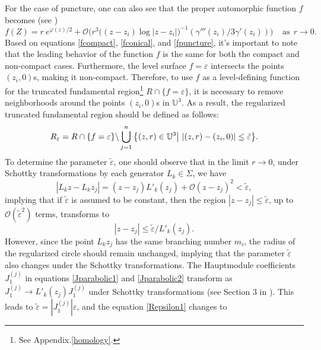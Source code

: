 \documentclass[a4paper,11pt]{article}
\begin{document}
For the case of puncture, one can also see that the proper automorphic function $f$ becomes 
(see \cite{park2017potentials})
\begin{equation}
f(Z)=r~e^{\varphi(z)/2} +\mathcal{O}\bigg(r^3 \big((z-z_i)\log|z-z_i
|\big)^{-1}(\gamma'''(z_i)/3\gamma'(z_i))\bigg)~~~~~ \text{as} ~~r\rightarrow 0.\label{fpuncture}
\end{equation}
Based on equations \eqref{fcompact}, \eqref{fconical}, and \eqref{fpuncture}, it's important to note that the leading behavior of the function $f$ is the same for both the compact and non-compact cases. Furthermore, the level surface $f=\varepsilon$ intersects the points $(z_i,0)$s, making it non-compact. Therefore, to use  $f$ as a level-defining function for the truncated fundamental region\footnote{See Appendix.\ref{homology}.} $R\cap\{f=\varepsilon\}$, it is necessary to remove neighborhoods around the points $(z_i,0)$s in $\mathbb{U}^3$. As a result, the regularized truncated fundamental region should be defined as follows:
\begin{equation}
R_{\varepsilon} = R\cap\{f=\varepsilon\}\backslash \bigcup_{j=1}^{n}\big{\{}(z,r)\in\mathbb{U}^3\big| ~|(z,r)-(z_i,0)| \leq \tilde{\varepsilon}\big{\}}.\label{Repsilon1}
\end{equation}
To determine the parameter $\tilde\varepsilon$, one should observe that in the limit $r\rightarrow 0$, under Schottky transformations by each generator $L_k\in\Sigma$, we have
\begin{equation}
|L_k z-L_k z_j| = (z-z_j)L'_k(z_j)+\mathcal{O}(z-z_j)^2 < \tilde\varepsilon,
\end{equation}
implying that if $\tilde\varepsilon$ is assumed to be constant, then the region $|z - z_j| \leq \tilde\varepsilon$, up to $\mathcal{O}(\tilde\varepsilon^2)$ terms, transforms to
\begin{equation}
|z-z_j| \leq  \tilde\varepsilon/L'_k(z_j).    
\end{equation}
However, since the point $L_k z_j$ has the same branching number $m_i$, the radius of the regularized circle should remain unchanged, implying that the parameter $\tilde\varepsilon$ also changes under the Schottky transformations. The Hauptmodule coefficients $J_1^{(j)}$ in equations \eqref{Jparabolic1} and \eqref{Jparabolic2} transform as $J_1^{(j)} \rightarrow L'_k(z_j) J_1^{(j)}$ under Schottky transformations (see Section 3 in \cite{Taghavi2024classical}). This leads to $\tilde\varepsilon = \left|J_1^{(j)}\right| \varepsilon$, and the equation \eqref{Repsilon1} changes to
\end{document}

